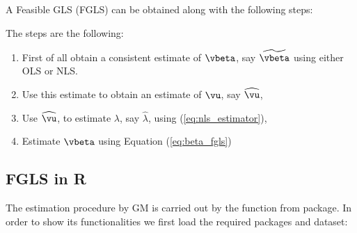\documentclass[english,12pt]{book}\usepackage[]{graphicx}\usepackage[]{xcolor}
\begin{document}
A Feasible GLS (FGLS) can be obtained along with the following steps:

\begin{algorithm}
The steps are the following:

\begin{enumerate}
  \item First of all obtain a consistent estimate of $\vbeta$, say $\widetilde{\vbeta}$ using either OLS or NLS.
  \item Use this estimate to obtain an estimate of $\vu$, say $\widehat{\vu}$,
  \item Use $\widehat{\vu}$, to estimate $\lambda$, say $\widehat{\lambda}$, using (\ref{eq:nls_estimator}),
  \item Estimate $\vbeta$ using Equation (\ref{eq:beta_fgls})
\end{enumerate}
\end{algorithm}





%


\subsection{FGLS in R}

The estimation procedure by GM is carried out by the  function from  package. In order to show its functionalities we first load the required packages and dataset:
\end{document}

